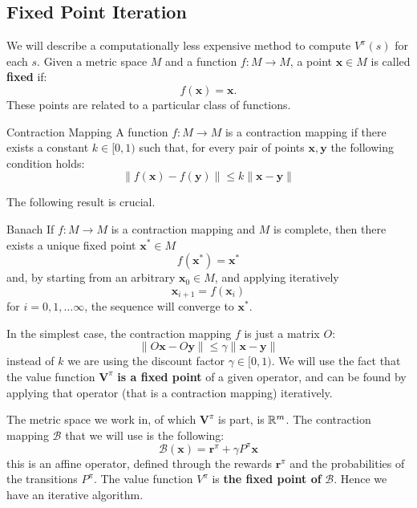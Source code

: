 \documentclass[10pt, a4paper]{report}
\begin{document}
\subsection{Fixed Point Iteration}
We will describe a computationally less expensive method to compute $V^\pi(s)$ for each $s$. Given a metric space $M$ and a function $f:M \rightarrow M$, a point $\mathbf x\in M$ is called \textbf{fixed} if:\begin{equation}
    f(\mathbf x)=\mathbf x.
\end{equation}
These points are related to a particular class of functions.
\begin{boxdefinition}{Contraction Mapping}{}
    A function $f:M \rightarrow M$ is a contraction mapping if  there exists a constant $k\in [0,1)$ such that, for every pair of points $\mathbf x,\mathbf y$ the following condition holds:\begin{equation}
        \|f(\mathbf x)-f(\mathbf y)\|\le k\|\mathbf x-\mathbf y\|
    \end{equation}
\end{boxdefinition}
\noindent The following result is crucial.
\begin{boxtheorem}{Banach}{}
    If $f:M\rightarrow M$ is a contraction mapping and $M$ is complete, then there exists a unique fixed point $\mathbf x^*\in M$
  $$
        f(\mathbf x^*)=\mathbf x^*
$$
    and, by starting from an arbitrary $\mathbf x_0\in M$, and applying iteratively  $$\mathbf x_{i+1}=f(\mathbf x_i)$$ for $i=0,1,\dots \infty$, the sequence will converge to $\mathbf x^*$.
\end{boxtheorem}
\noindent In the simplest case, the contraction mapping $f$ is just a matrix $O$:
\begin{equation}
        \|O\mathbf x-O\mathbf y\|\le \gamma \|\mathbf x-\mathbf y\|
\end{equation}
instead of $k$ we are  using the discount factor $\gamma\in [0,1)$. We will use the fact that the value function $\mathbf V^\pi$ \textbf{is a fixed point} of a given operator, and can be found by applying that operator (that is a contraction mapping) iteratively.\bigskip 


The metric space we work in, of which $\mathbf V^\pi$ is part, is ${\mathbb R}^m$. The contraction mapping $\mathcal B$ that we will use is the following:\begin{equation}
    \mathcal B(\mathbf x)=\mathbf r^\pi+\gamma P^\pi\mathbf x
\end{equation}
this is an affine operator, defined through the rewards $\mathbf r^\pi$ and the probabilities of the transitions $P^\pi$. The value function $V^\pi$ is \textbf{the fixed point of} $\mathcal B$. Hence we have an iterative algorithm.
\end{document}
